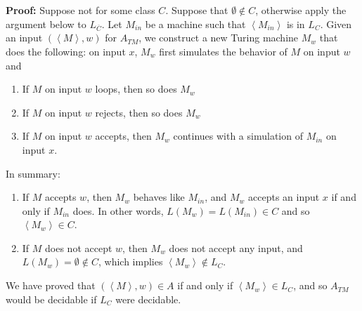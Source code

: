\documentclass[10pt,landscape]{article}
\newcommand{\encode}[1]{\left\langle #1 \right\rangle}
\newcommand{\comp}[1]{\overline{#1}}
\begin{document}
\begin{multicols*}{3}
\textbf{Proof:} Suppose not for some class $C$. Suppose that $\emptyset \not\in C$, otherwise apply the argument below to $L_{\comp{C}}$. Let $M_{in}$ be a machine such that $\encode{M_{in}}$ is in $L_C$. Given an input $(\encode{M}, w)$ for $A_{TM}$, we construct a new Turing machine $M_w$ that does the following: on input $x$, $M_w$ first simulates the behavior of $M$ on input $w$ and 
\begin{enumerate}[label=\textbullet]
\item If $M$ on input $w$ loops, then so does $M_w$
\item If $M$ on input $w$ rejects, then so does $M_w$
\item If $M$ on input $w$ accepts, then $M_w$ continues with a simulation of $M_{in}$ on input $x$. 
\end{enumerate}
In summary:
\begin{enumerate}[label=\textbullet]
\item If $M$ accepts $w$, then $M_w$ behaves like $M_{in}$, and $M_w$ accepts an input $x$ if and only if $M_{in}$ does. In other words, $L(M_w) = L(M_{in}) \in C$ and so $\encode{M_w} \in C$. 
\item If $M$ does not accept $w$, then $M_w$ does not accept any input, and $L(M_w) = \emptyset \not\in C$, which implies $\encode{M_w} \not\in L_C$.
\end{enumerate}
We have proved that $(\encode{M}, w) \in A$ if and only if $\encode{M_w} \in L_C$, and so $A_{TM}$ would be decidable if $L_C$ were decidable. 


\end{multicols*}
\end{document}
